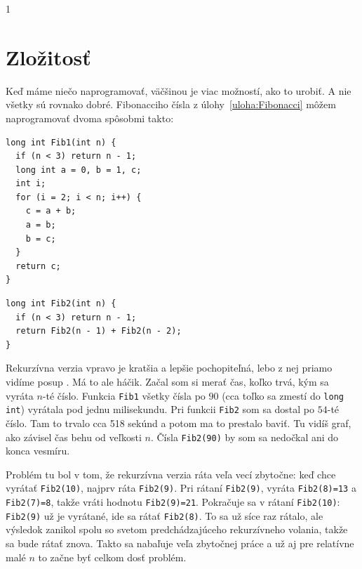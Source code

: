 \documentclass[10pt]{article}
\def\prg{\lstinline}
\def\ods{\vspace*{10pt}}
\def\bp{\begin{minipage}[t]{0.45\textwidth}\vspace{0pt}}
\def\ep{\end{minipage}}
\def\sectxii{1}  %
\def\sectxii{0}  %
\begin{document}
\fi

\if\sectxii1
\section{Zložitosť}
\label{sect:zlozitost}

Keď máme niečo naprogramovať, väčšinou je viac možností, ako to urobiť. A nie všetky sú 
rovnako dobré. Fibonacciho čísla z úlohy~\ref{uloha:Fibonacci} môžem naprogramovať
dvoma spôsobmi takto:

\ods
\bp
\begin{lstlisting}[] 
long int Fib1(int n) {
  if (n < 3) return n - 1;
  long int a = 0, b = 1, c;
  int i;
  for (i = 2; i < n; i++) {
    c = a + b;
    a = b;
    b = c;
  }
  return c;
}
\end{lstlisting}
\ep
\hfil
\bp
\begin{lstlisting}[] 
long int Fib2(int n) {
  if (n < 3) return n - 1;
  return Fib2(n - 1) + Fib2(n - 2);
}
\end{lstlisting}
\ep

\ods
Rekurzívna verzia vpravo je kratšia a lepšie pochopiteľná, lebo z nej priamo vidíme
posup .
Má to ale háčik. Začal som si merať čas, koľko trvá, kým sa vyráta $n$-té číslo. 
Funkcia \prg!Fib1! všetky čísla po $90$ (cca toľko sa zmestí do \prg!long int!) vyrátala
pod jednu milisekundu. Pri funkcii \prg!Fib2! som sa dostal po $54$-té číslo. Tam to trvalo
cca 518 sekúnd a potom ma to prestalo baviť. Tu vidíš graf, ako závisel čas behu od veľkosti
$n$. Čísla {\tt Fib2(90)} by som sa nedočkal ani do konca vesmíru.

\ods
{}

\ods
Problém tu bol v tom, že rekurzívna verzia ráta veľa vecí zbytočne: keď chce vyrátať
{\tt Fib2(10)}, najprv ráta {\tt Fib2(9)}. Pri rátaní {\tt Fib2(9)}, vyráta 
{\tt Fib2(8)=13}
a {\tt Fib2(7)=8}, takže vráti hodnotu {\tt Fib2(9)=21}. Pokračuje sa v rátaní
{\tt Fib2(10)}: {\tt Fib2(9)} už je vyrátané, ide sa 
 rátať {\tt Fib2(8)}. To sa už síce raz rátalo, ale výsledok
zanikol spolu so svetom predchádzajúceho rekurzívneho volania, takže sa bude rátať
znova. Takto sa nabaľuje veľa 
zbytočnej práce a už aj pre relatívne malé $n$ to začne byť celkom dosť problém.
\end{document}
